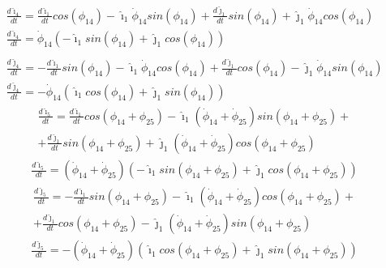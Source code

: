 \documentclass[12pt]{article}
\begin{document}
 	\begin{gather}
 	\frac {d \hat{\imath}_{4}} {dt} = \frac{d\hat{\imath}_{1}} {dt} cos (\phi_{14}) - \hat{\imath}_{1} \dot{\phi}_{14}  sin (\phi_{14})+\frac{d\hat{\jmath}_{1}} {dt} sin (\phi_{14})+ \hat{\jmath}_{1} \dot{\phi}_{14}  cos (\phi_{14}) \nonumber\\
 	\frac {d \hat{\imath}_{4}} {dt} =\dot{\phi}_{14} (-\hat{\imath}_{1} sin (\phi_{14}) + \hat{\jmath}_{1} cos (\phi_{14})) \label{eq:di4cos}\\
 	\nonumber\\
 	\frac {d \hat{\jmath}_{4}} {dt} = - \frac{d\hat{\imath}_{1}} {dt} sin (\phi_{14}) - \hat{\imath}_{1} \dot{\phi}_{14}  cos (\phi_{14})+\frac{d\hat{\jmath}_{1}} {dt} cos (\phi_{14})- \hat{\jmath}_{1} \dot{\phi}_{14}  sin (\phi_{14}) \nonumber\\
 	\frac {d \hat{\jmath}_{4}} {dt} = - \dot{\phi}_{14} (\hat{\imath}_{1} cos (\phi_{14}) + \hat{\jmath}_{1} sin (\phi_{14})) \label{eq:dj4cos}
 	\end{gather}	
 	\begin{multline*}
 	\frac {d \hat{\imath}_{5}} {dt} = \frac{d\hat{\imath}_{1}} {dt} cos (\phi_{14} + \phi_{25}) - \hat{\imath}_{1} (\dot{\phi}_{14} + \dot{\phi}_{25}) sin (\phi_{14}+ \phi_{25})+\\+\frac{d\hat{\jmath}_{1}} {dt} sin (\phi_{14} + \phi_{25})+ \hat{\jmath}_{1} (\dot{\phi}_{14}+\dot{\phi}_{25})  cos (\phi_{14} + \phi_{25})
 	\end{multline*}
 	\begin{gather}
 	\label{eq:di5cos}
 	\frac {d \hat{\imath}_{5}} {dt} =(\dot{\phi}_{14} + \dot{\phi}_{25}) (-\hat{\imath}_{1} sin (\phi_{14}+\phi_{25}) + \hat{\jmath}_{1} cos (\phi_{14}+\phi_{25}))
 	\end{gather}
 	\begin{multline*}
 	\frac {d \hat{\jmath}_{5}} {dt} = - \frac{d\hat{\imath}_{1}} {dt} sin (\phi_{14} + \phi_{25}) - \hat{\imath}_{1} (\dot{\phi}_{14} + \dot{\phi}_{25})  cos (\phi_{14} + \phi_{25})+\\+\frac{d\hat{\jmath}_{1}} {dt} cos (\phi_{14} + \phi_{25})- \hat{\jmath}_{1} (\dot{\phi}_{14} + \dot{\phi}_{25})  sin (\phi_{14} + \phi_{25})
 	\end{multline*}
 	\begin{gather}
 	\label{eq:dj5cos}
 	\frac {d \hat{\jmath}_{5}} {dt} =-(\dot{\phi}_{14} + \dot{\phi}_{25}) (\hat{\imath}_{1} cos (\phi_{14}+\phi_{25}) + \hat{\jmath}_{1} sin (\phi_{14}+\phi_{25}))
 	\end{gather}
 	
\end{document}
